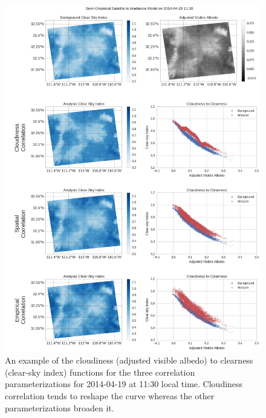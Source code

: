 \begin{figure}[p]
\centering
\includegraphics[width=.9\textwidth]{figs/cld_to_clear_Semi-Empirical_2014-04-19.png}
\caption[Clearness versus Cloudiness for SE model on 4/19]{An example
  of the cloudiness (adjusted visible albedo) to clearness (clear-sky
  index) functions for the three correlation parameterizations for
  2014-04-19 at 11:30 local time. Cloudiness correlation tends to
  reshape the curve whereas the other parameterizations broaden it.}
\label{fig:cldclr_se_419}
\end{figure}

